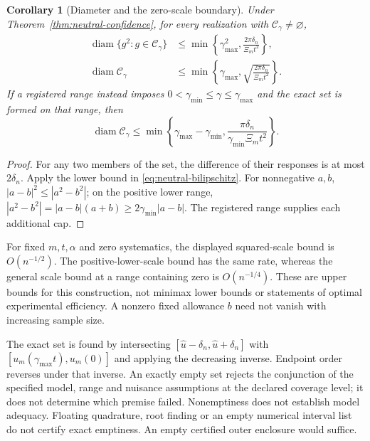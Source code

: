 \documentclass[11pt]{article}
\newtheorem{corollary}[theorem]{Corollary}
\theoremstyle{definition}
\begin{document}
\begin{corollary}[Diameter and the zero-scale boundary]
\label{cor:neutral-width}
Under Theorem~\ref{thm:neutral-confidence}, for every realization with
$\mathcal C_\gamma\ne\varnothing$,
\begin{align}
 \operatorname{diam}\{g^2:g\in\mathcal C_\gamma\}
 &\le \min\left\{\gamma_{\max}^2,
                \frac{2\pi\delta_n}{\Xi_mt^2}\right\},
 \label{eq:neutral-squared-width}\\
 \operatorname{diam}\mathcal C_\gamma
 &\le \min\left\{\gamma_{\max},
          \sqrt{\frac{2\pi\delta_n}{\Xi_mt^2}}\right\}.
 \label{eq:neutral-zero-width}
\end{align}
If a registered range instead imposes
$0<\gamma_{\min}\le\gamma\le\gamma_{\max}$ and the exact set is formed
on that range, then
\begin{equation}
 \operatorname{diam}\mathcal C_\gamma
 \le\min\left\{\gamma_{\max}-\gamma_{\min},
              \frac{\pi\delta_n}{\gamma_{\min}\Xi_mt^2}\right\}.
 \label{eq:neutral-positive-width}
\end{equation}
\end{corollary}
\begin{proof}
For any two members of the set, the difference of their responses is at
most $2\delta_n$. Apply the lower bound in
\eqref{eq:neutral-bilipschitz}. For nonnegative $a,b$,
$|a-b|^2\le|a^2-b^2|$; on the positive lower range,
$|a^2-b^2|=|a-b|(a+b)\ge2\gamma_{\min}|a-b|$.
The registered range supplies each additional cap.
\end{proof}

For fixed $m,t,\alpha$ and zero systematics, the displayed squared-scale
bound is $O(n^{-1/2})$. The positive-lower-scale bound has the same rate,
whereas the general scale bound at a range containing zero is
$O(n^{-1/4})$. These are upper bounds for this construction, not minimax
lower bounds or statements of optimal experimental efficiency. A nonzero
fixed allowance $b$ need not vanish with increasing sample size.

The exact set is found by intersecting
$[\widehat u-\delta_n,\widehat u+\delta_n]$ with
$[u_m(\gamma_{\max}t),u_m(0)]$ and applying the decreasing inverse.
Endpoint order reverses under that inverse. An exactly empty set rejects
the conjunction of the specified model, range and nuisance assumptions
at the declared coverage level; it does not determine which premise
failed. Nonemptiness does not establish model adequacy.
Floating quadrature, root finding or an empty numerical interval list do
not certify exact emptiness. An empty certified outer enclosure would
suffice.
\end{document}
